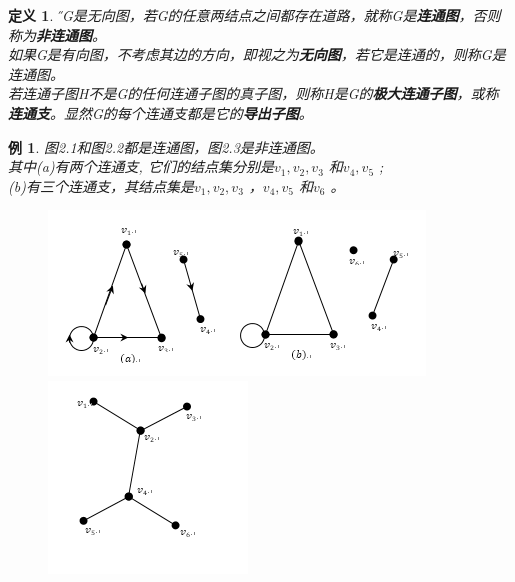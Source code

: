 \documentclass[11pt,a4paper,openany]{book}
\newtheorem{defination}{\textbf{定义}}[section]
\newtheorem{sample}{\textbf{例}}[section]
\begin{document}
\begin{defination}\H
 设G是无向图，若G的任意两结点之间都存在道路，就称G是\textbf{连通图}，否则称为\textbf{非连通图}。\\
 如果G是有向图，不考虑其边的方向，即视之为\textbf{无向图}，若它是连通的，则称G是连通图。\\
若连通子图H不是G的任何连通子图的真子图，则称H是G的\textbf{极大连通子图}，或称\textbf{连通支}。显然G的每个连通支都是它的\textbf{导出子图}。
\end{defination}
\begin{sample}\K
图2.1和图2.2都是连通图，图2.3是非连通图。\\
其中(a)有两个连通支, 它们的结点集分别是{$v_1,v_2,v_3$ }和{$v_4,v_5$ };\\
(b)有三个连通支，其结点集是{$v_1,v_2,v_3$ }，{$v_4,v_5$ } 和{$v_6$ }。\\
\end{sample}
\begin{figure}
  \centering
  \begin{minipage}[!ht]{.6\linewidth}
  \includegraphics[width=1.0\linewidth]{2.3.png}
  \caption{}
  \end{minipage}
  \begin{minipage}[!ht]{.4\linewidth}
   \includegraphics[width=1.0\linewidth]{2.4.png}
  \caption{}
  \end{minipage}
\end{figure}
\end{document}
